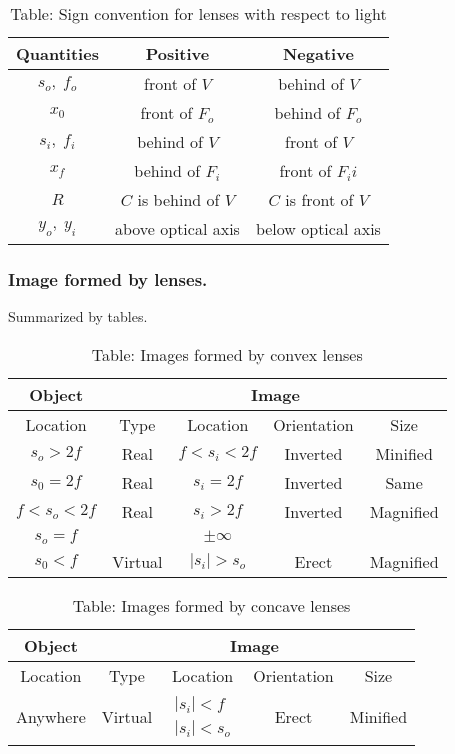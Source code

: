 \documentclass[../../../main.tex]{subfiles}
\begin{document}
\begin{table}
    \centering
    \caption*{Table: Sign convention for lenses with respect to light}
    \begin{tabular}{c c c}
        \toprule
        Quantities & Positive & Negative\\ 
        \midrule
        $s_o,\;f_o$& front of $V $ & behind of $V $ \\ 
        $x_0$& front of $F_o $ & behind of $F_o $\\
        $s_i,\;f_i$& behind of $V $ & front of $V $\\
        $x_f$& behind of $F_i $ & front of $F_ii $\\
        $R$& $C$ is behind of $V $ & $C$ is front of $V $\\
        $y_o,\;y_i$& above optical axis &below optical axis\\
        \bottomrule        
    \end{tabular}
\end{table}

\subsubsection*{Image formed by lenses.} Summarized by tables.
\begin{table}
    \centering
    \caption*{Table: Images formed by convex lenses}
    \begin{tabular}{ccccc}
        \toprule
        Object & \multicolumn{4}{c}{Image}\\
        \midrule
        Location & Type & Location & Orientation & Size\\
        \midrule
        $s_o>2f$ &Real &$f<s_i<2f$ &Inverted &Minified \\
        $s_0=2f$ &Real &$s_i=2f$ &Inverted &Same \\
        $f<s_o<2f$ &Real &$s_i>2f$ &Inverted &Magnified \\
        $s_o=f$ & &$\pm \infty$ & & \\
        $s_0<f$ &Virtual &$|s_i|>s_o$ &Erect &Magnified \\
        \bottomrule
    \end{tabular}
\end{table}

\begin{table}
    \centering
    \caption*{Table: Images formed by concave lenses}
    \begin{tabular}{ccccc}
        \toprule
        Object & \multicolumn{4}{c}{Image}\\
        \midrule
        Location & Type & Location & Orientation & Size\\
        \midrule
        Anywhere &Virtual &$\begin{matrix}|s_i|<f \\|s_i|<s_o\end{matrix}$ &Erect &Minified \\
        \bottomrule
    \end{tabular}
\end{table}
\end{document}
